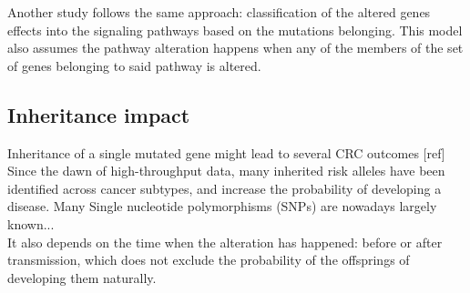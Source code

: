 Another study \cite{Attolini2010ACancer} follows the same approach: classification of the altered genes effects into the signaling pathways based on the mutations belonging. This model also assumes the pathway alteration happens when any of the members of the set of genes belonging to said pathway is altered.

\cite{Khakabimamaghani2019UncoveringDysregulation}

\subsection{Inheritance impact}
Inheritance of a single mutated gene might lead to several CRC outcomes [ref]
Since the dawn of high-throughput data, many inherited risk alleles have been identified across cancer subtypes, and increase the probability of developing a disease. Many Single nucleotide polymorphisms (SNPs) are nowadays largely known...
\\

It also depends on the time when the alteration has happened: before or after transmission, which does not exclude the probability of the offsprings of developing them naturally.